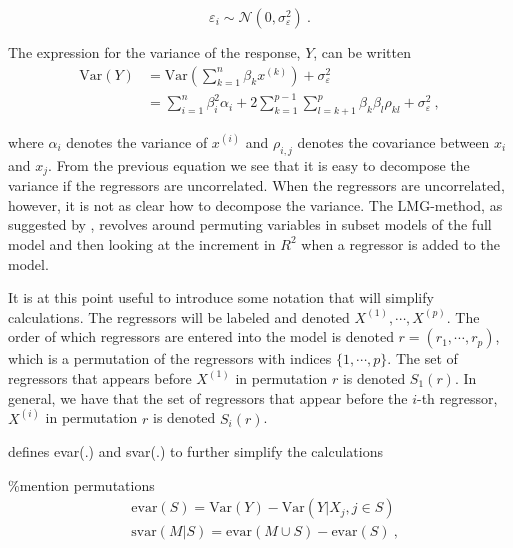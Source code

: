 \documentclass[
]{article}
\begin{document}
\begin{equation}
    \varepsilon_i \sim \mathcal{N}(0,\sigma_\varepsilon^2) \ .
\end{equation}

The expression for the variance of the response, \(Y\), can be written
\begin{equation}
    \begin{split}
        \textrm{Var}(Y) &= \textrm{Var}\left(\sum_{k=1}^n \beta_k x^{(k)}\right)+ \sigma_\varepsilon^2\\
        & = \sum_{i=1}^n \beta_i^2\alpha_i  +2\sum_{k=1}^{p-1}\sum_{l=k+1}^p \beta_k\beta_l\rho_{kl} + \sigma_\varepsilon^2 \ ,
    \end{split}
    \label{y_var}
\end{equation}

where \(\alpha_i\) denotes the variance of \(x^{(i)}\) and
\(\rho_{i,j}\) denotes the covariance between \(x_i\) and \(x_j\). From
the previous equation we see that it is easy to decompose the variance
if the regressors are uncorrelated. When the regressors are
uncorrelated, however, it is not as clear how to decompose the variance.
The LMG-method, as suggested by \cite{lindeman1980introduction},
revolves around permuting variables in subset models of the full model
and then looking at the increment in \(R^2\) when a regressor is added
to the model.

It is at this point useful to introduce some notation that will simplify
calculations. The regressors will be labeled and denoted
\(X^{(1)},\cdots, X^{(p)}\). The order of which regressors are entered
into the model is denoted \(r = (r_1, \cdots, r_p)\), which is a
permutation of the regressors with indices \(\{1, \cdots, p\}\). The set
of regressors that appears before \(X^{(1)}\) in permutation \(r\) is
denoted \(S_1(r)\). In general, we have that the set of regressors that
appear before the \(i\)-th regressor, \(X^{(i)}\) in permutation \(r\)
is denoted \(S_i(r)\).

\cite{statPractice2007} defines evar(.) and svar(.) to further simplify
the calculations

\%mention permutations \begin{equation}
    \begin{split}
        &\textrm{evar}(S) = \textrm{Var}(Y) - \textrm{Var}(Y|X_j, j\in S) \\
        &\textrm{svar}(M|S) = \textrm{evar}(M \cup S) - \textrm{evar}(S) \ ,
    \end{split}
\end{equation}
\end{document}
